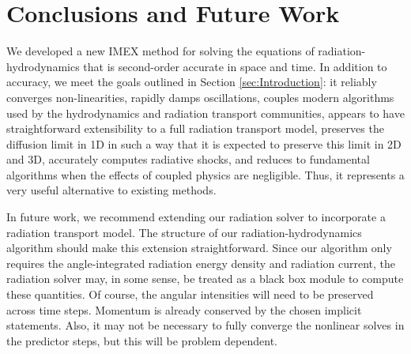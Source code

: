 \documentclass[preprint,12pt]{elsarticle}
\begin{document}
\section{Conclusions and Future Work}
\label{sec:Conclusions}

We developed a new IMEX method for solving the equations of radiation-hydrodynamics that is second-order accurate in space
and time.  In addition to accuracy, we meet the goals outlined in Section \ref{sec:Introduction}: it reliably converges
non-linearities, rapidly damps oscillations, couples modern algorithms used by the hydrodynamics and radiation
transport communities, appears to have straightforward extensibility to a full radiation transport model, preserves the
diffusion limit in 1D in such a way that it is expected to preserve this limit in 2D and 3D, accurately computes
radiative shocks, and reduces to fundamental algorithms when the effects of coupled physics are negligible.  Thus, it
represents a very useful alternative to existing methods.

In future work, we recommend extending our radiation solver to incorporate a radiation transport model.  The structure
of our radiation-hydrodynamics algorithm should make this extension straightforward.  Since our algorithm only requires
the angle-integrated radiation energy density and radiation current, the radiation solver may, in some sense, be treated
as a black box module to compute these quantities.  Of course, the angular intensities will need to be preserved across
time steps. Momentum is already conserved by the chosen implicit statements.  Also, it may not be necessary to fully
converge the nonlinear solves in the predictor steps, but this will be problem dependent.






\clearpage

\appendix
\end{document}
